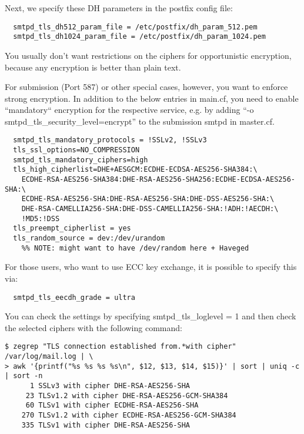 Next, we specify these DH parameters in the postfix config file:

\begin{verbatim}
  smtpd_tls_dh512_param_file = /etc/postfix/dh_param_512.pem
  smtpd_tls_dh1024_param_file = /etc/postfix/dh_param_1024.pem
\end{verbatim}

You usually don't want restrictions on the ciphers for opportunistic
encryption, because any encryption is better than plain text. 

For submission (Port 587) or other special cases, however, you want to
enforce strong encryption. In addition to the below entries in
main.cf, you need to enable ``mandatory`` encryption for the
respective service, e.g. by adding ``-o
smtpd\_tls\_security\_level=encrypt'' to the submission smtpd in
master.cf.


\begin{verbatim}
  smtpd_tls_mandatory_protocols = !SSLv2, !SSLv3
  tls_ssl_options=NO_COMPRESSION
  smtpd_tls_mandatory_ciphers=high
  tls_high_cipherlist=DHE+AESGCM:ECDHE-ECDSA-AES256-SHA384:\
    ECDHE-RSA-AES256-SHA384:DHE-RSA-AES256-SHA256:ECDHE-ECDSA-AES256-SHA:\
    ECDHE-RSA-AES256-SHA:DHE-RSA-AES256-SHA:DHE-DSS-AES256-SHA:\
    DHE-RSA-CAMELLIA256-SHA:DHE-DSS-CAMELLIA256-SHA:!ADH:!AECDH:\
    !MD5:!DSS
  tls_preempt_cipherlist = yes
  tls_random_source = dev:/dev/urandom		
    %% NOTE: might want to have /dev/random here + Haveged
\end{verbatim}
  
For those users, who want to use ECC key exchange, it is possible to specify this via:
\begin{verbatim}
  smtpd_tls_eecdh_grade = ultra
\end{verbatim}

You can check the settings by specifying  smtpd\_tls\_loglevel = 1 and then check the selected ciphers with the following command:
\begin{verbatim}
$ zegrep "TLS connection established from.*with cipher" /var/log/mail.log | \
> awk '{printf("%s %s %s %s\n", $12, $13, $14, $15)}' | sort | uniq -c | sort -n
      1 SSLv3 with cipher DHE-RSA-AES256-SHA
     23 TLSv1.2 with cipher DHE-RSA-AES256-GCM-SHA384
     60 TLSv1 with cipher ECDHE-RSA-AES256-SHA
    270 TLSv1.2 with cipher ECDHE-RSA-AES256-GCM-SHA384
    335 TLSv1 with cipher DHE-RSA-AES256-SHA
\end{verbatim}


